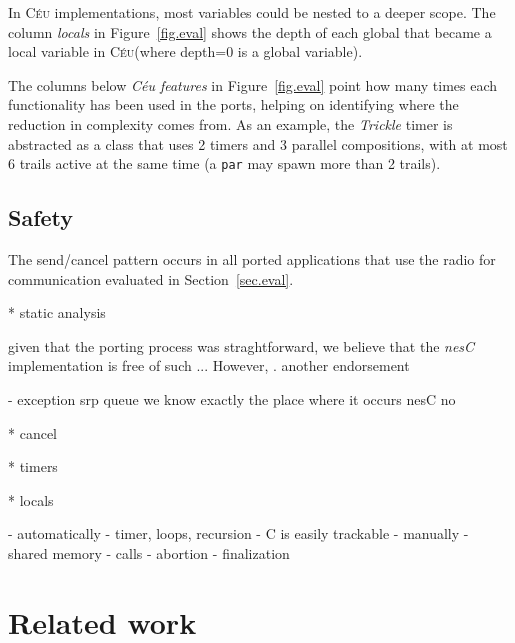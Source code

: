 \documentclass[10pt]{sensys-proc}
\newcommand{\CEU}{\textsc{C\'{e}u}\xspace}
\newcommand{\code}[1] {{\small{\texttt{#1}}}}
\begin{document}
In \CEU implementations, most variables could be nested to a deeper scope.
The column \emph{locals} in Figure~\ref{fig.eval} shows the depth of each 
global that became a local variable in \CEU (where depth=0 is a global 
variable).

The columns below \emph{C\'eu features} in Figure~\ref{fig.eval} point how many 
times each functionality has been used in the ports, helping on identifying 
where the reduction in complexity comes from.
As an example, the \emph{Trickle} timer is abstracted as a class that uses 2 
timers and 3 parallel compositions, with at most 6 trails active at the same 
time (a \code{par} may spawn more than 2 trails).


\subsection{Safety}

The send/cancel pattern occurs in all ported applications that use the radio 
for communication evaluated in Section~\ref{sec.eval}.



* static analysis

given that the porting process was straghtforward, we believe that the 
\emph{nesC} implementation is free of such ...
However, .
another endorsement

- exception srp queue
we know exactly the place where it occurs
nesC no

* cancel

* timers

* locals

- automatically
    - timer, loops, recursion
    - C is easily trackable
- manually
    - shared memory
    - calls
    - abortion
    - finalization



\section{Related work}
\label{sec.related}
\end{document}
